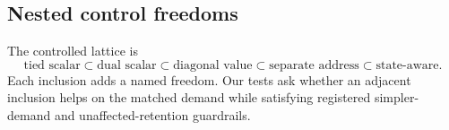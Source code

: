 \subsection{Nested control freedoms}

The controlled lattice is
\begin{equation}
\text{tied scalar}
\subset \text{dual scalar}
\subset \text{diagonal value}
\subset \text{separate address}
\subset \text{state-aware}.
\end{equation}
Each inclusion adds a named freedom.  Our tests ask whether an adjacent
inclusion helps on the matched demand while satisfying registered
simpler-demand and unaffected-retention guardrails.
